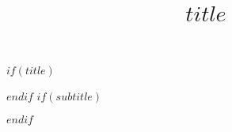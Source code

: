 \def\maketitle{
\pagenumbering{roman}
{\thispagestyle{empty}%
  \null\vskip 1in
  \begin{center}\fontsize{24}{28}\sf
     \textbf{$title$}\\[2cm]
     \fontsize{18}{20}\sf $author$\\[0.2cm]
     
     \vfill
     
     \texttt{[image: includes/Amherst-College-wordmark-seal-centered-purple-RGB-900px.png]}
     \vskip 0.5in
     \fontsize{13}{15}\sf Submitted to the Department of $department$\\
     of Amherst College in partial fulfillment of the requirements \\
     for the degree of Bachelor of Arts with honors.\\
     \vskip 0.5in
     Advisor(s):\\
     \fontsize{13}{15}\sf $advisors$
    \vskip 0.5in
    $date$
  \end{center}
  \newpage\mbox{}\thispagestyle{empty}\newpage
}
}


$if(title)$
\title{$title$}
$endif$
$if(subtitle)$
\usepackage{etoolbox}
\makeatletter
\providecommand{\subtitle}[1]{%
  \apptocmd{\@title}{\par {\large #1 \par}}{}{}
}
\makeatother
\subtitle{$subtitle$}
$endif$